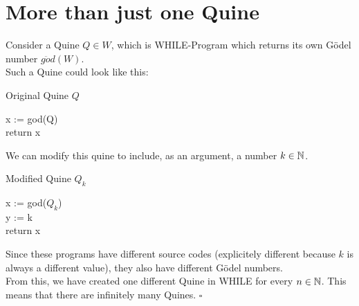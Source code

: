 

\setcounter{section}{2}



\section{More than just one Quine}

Consider a Quine $Q \in W$, which is \textsc{WHILE}-Program which returns its own Gödel number $g\ddot{o}d(W)$.\\
Such a Quine could look like this:
\begin{algorithm}[H]
\caption{Original Quine $Q$}
x := god(Q)\\
return x
\end{algorithm}
We can modify this quine to include, as an argument, a number $k \in \mathbb{N}$.
\begin{algorithm}[H]
\caption{Modified Quine $Q_{k}$}
x := god($Q_{k}$)\\
y := k\\
return x
\end{algorithm}
Since these programs have different source codes (explicitely different because $k$ is always a different value), they also have different Gödel numbers.\\
From this, we have created one different Quine in \textsc{WHILE} for every $n\in\mathbb{N}$. This means that there are infinitely many Quines. $\square$


